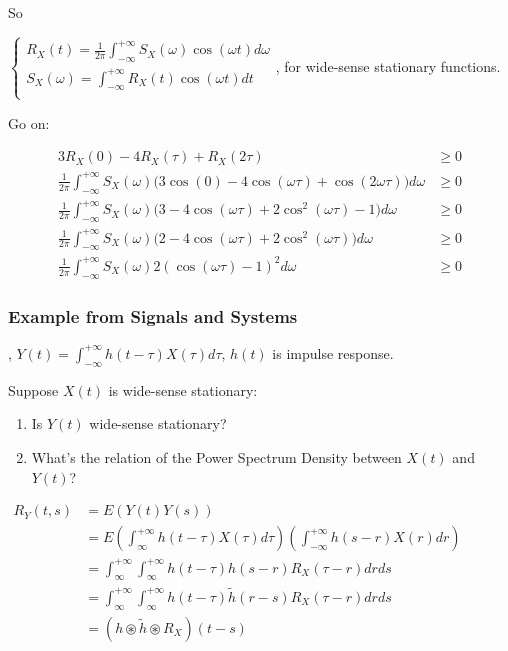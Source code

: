 \documentclass[a4paper]{article}
\begin{document}
\begin{enumerate}
    So

    $\begin{cases}
    R_X(t)=\frac{1}{2\pi}\int_{-\infty}^{+\infty}S_X(\omega)\cos(\omega t) d\omega \\
    S_X(\omega)=\int_{-\infty}^{+\infty}R_X(t)\cos(\omega t) dt \\
    \end{cases}$, for wide-sense stationary functions.

    Go on:

    $$\begin{aligned}
      3R_X(0)-4R_X(\tau)+R_X(2\tau)&\geq 0 \\
      \frac{1}{2\pi}\int_{-\infty}^{+\infty}S_X(\omega)\bigl(3\cos(0) - 4\cos(\omega \tau) + \cos(2\omega\tau)\bigr)d\omega &\geq 0 \\
\frac{1}{2\pi}\int_{-\infty}^{+\infty}S_X(\omega)\bigl(3 - 4\cos(\omega \tau) + 2\cos^2(\omega\tau)-1\bigr)d\omega &\geq 0 \\
\frac{1}{2\pi}\int_{-\infty}^{+\infty}S_X(\omega)\bigl(2 - 4\cos(\omega \tau) + 2\cos^2(\omega\tau)\bigr)d\omega &\geq 0 \\
\frac{1}{2\pi}\int_{-\infty}^{+\infty}S_X(\omega)2(\cos(\omega\tau)-1)^2d\omega &\geq 0
  \end{aligned}$$
\end{enumerate}

\subsubsection*{Example from Signals and Systems}

, $Y(t)=\int_{-\infty}^{+\infty}h(t-\tau)X(\tau)d\tau$, $h(t)$ is impulse response.

Suppose $X(t)$ is wide-sense stationary:

\begin{enumerate}
  \item Is $Y(t)$ wide-sense stationary?
  \item What's the relation of the Power Spectrum Density between $X(t)$ and $Y(t)$?
\end{enumerate}

$\begin{aligned}
  R_Y(t,s)&=E(Y(t)Y(s)) \\
          &=E(\int_{\infty}^{+\infty}h(t-\tau)X(\tau)d\tau)(\int_{-\infty}^{+\infty}h(s-r)X(r)dr) \\
          &=\int_{\infty}^{+\infty}\int_{\infty}^{+\infty}h(t-\tau)h(s-r)R_X(\tau-r)drds \\
          &=\int_{\infty}^{+\infty}\int_{\infty}^{+\infty}h(t-\tau)\tilde h(r-s)R_X(\tau-r)drds \\
          &=(h\circledast\tilde h\circledast R_X)(t-s)
\end{aligned}$
\end{document}
